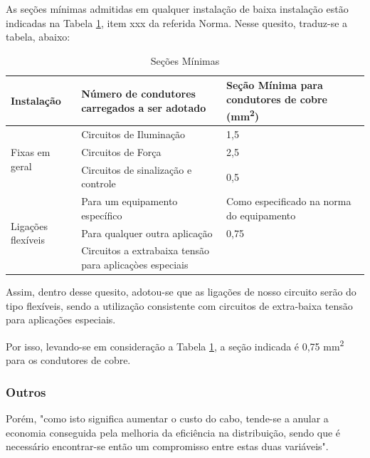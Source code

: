 As seções mínimas admitidas em qualquer instalação de baixa instalação estão indicadas na Tabela \ref{secoes-minimas}, item xxx da referida Norma. Nesse quesito, traduz-se a tabela, abaixo:

\begin{table}[h]
\begin{tabular}{ |l | p{7cm} | p{5cm} |}
\hline
Instalação                          & Número de condutores carregados a ser adotado           & Seção Mínima para condutores de cobre (mm\textsuperscript{2}) \\ \hline
\multirow{3}{*}{Fixas em geral}     & Circuitos de Iluminação                                 & 1,5                                        \\ \cline{2-3}
                                    & Circuitos de Força                                      & 2,5                                        \\ \cline{2-3}
                                    & Circuitos de sinalização e controle                     & 0,5                                        \\ \hline
\multirow{3}{*}{Ligações flexíveis} & Para um equipamento específico                          & Como especificado na norma do equipamento  \\ \cline{2-3}
                                    & Para qualquer outra aplicação                           & 0,75                                       \\ \cline{2-3} 
                                    & Circuitos a extrabaixa tensão para aplicaçòes especiais &                                           
\\ \hline
\end{tabular}
\caption{Seções Mínimas}
\label{secoes-minimas}
\end{table}

Assim, dentro desse quesito, adotou-se que as ligações de nosso circuito serão do tipo flexíveis, sendo a utilização consistente com circuitos de extra-baixa tensão para aplicações especiais. 

Por isso, levando-se em consideração a Tabela \ref{secoes-minimas}, a seção indicada é 0,75 mm\textsuperscript{2} para os condutores de cobre.

\subsubsection{Outros}

Porém, "como isto significa aumentar o custo do cabo, tende-se a anular a economia conseguida pela melhoria da eficiência na distribuição, sendo que é necessário encontrar-se então um compromisso entre estas duas variáveis".

